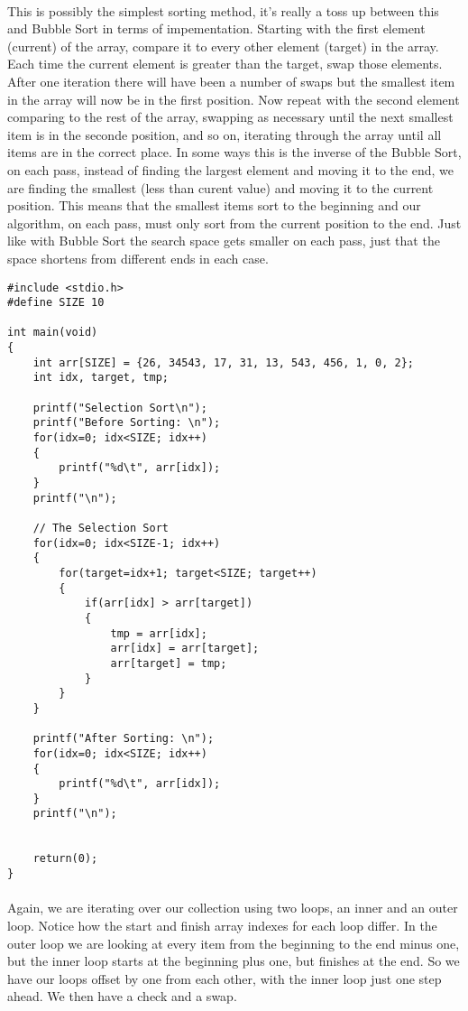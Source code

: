 \documentclass[10pt, a4paper, twosize]{article}
\begin{document}
\paragraph{} This is possibly the simplest sorting method, it's really a toss up between this and Bubble Sort in terms of impementation. Starting with the first element (current) of the array, compare it to every other element (target) in the array. Each time the current element is greater than the target, swap those elements. After one iteration there will have been a number of swaps but the smallest item in the array will now be in the first position. Now repeat with the second element comparing to the rest of the array, swapping as necessary until the next smallest item is in the seconde position, and so on, iterating through the array until all items are in the correct place. In some ways this is the inverse of the Bubble Sort, on each pass, instead of finding the largest element and moving it to the end, we are finding the smallest (less than curent value) and moving it to the current position. This means that the smallest items sort to the beginning and our algorithm, on each pass, must only sort from the current position to the end. Just like with Bubble Sort the search space gets smaller on each pass, just that the space shortens from different ends in each case.

\begin{lstlisting}
#include <stdio.h>
#define SIZE 10

int main(void)
{
    int arr[SIZE] = {26, 34543, 17, 31, 13, 543, 456, 1, 0, 2};
    int idx, target, tmp;

    printf("Selection Sort\n");
    printf("Before Sorting: \n");
    for(idx=0; idx<SIZE; idx++)
    {
        printf("%d\t", arr[idx]);
    }
    printf("\n");

    // The Selection Sort
    for(idx=0; idx<SIZE-1; idx++)
    {
        for(target=idx+1; target<SIZE; target++)
        {
            if(arr[idx] > arr[target])
            {
                tmp = arr[idx];
                arr[idx] = arr[target];
                arr[target] = tmp;
            }
        }
    }

    printf("After Sorting: \n");
    for(idx=0; idx<SIZE; idx++)
    {
        printf("%d\t", arr[idx]);
    }
    printf("\n");


    return(0);
}
\end{lstlisting}

\paragraph{} Again, we are iterating over our collection using two loops, an inner and an outer loop. Notice how the start and finish array indexes for each loop differ. In the outer loop we are looking at every item from the beginning to the end minus one, but the inner loop starts at the beginning plus one, but finishes at the end. So we have our loops offset by one from each other, with the inner loop just one step ahead. We then have a check and a swap.
\end{document}
